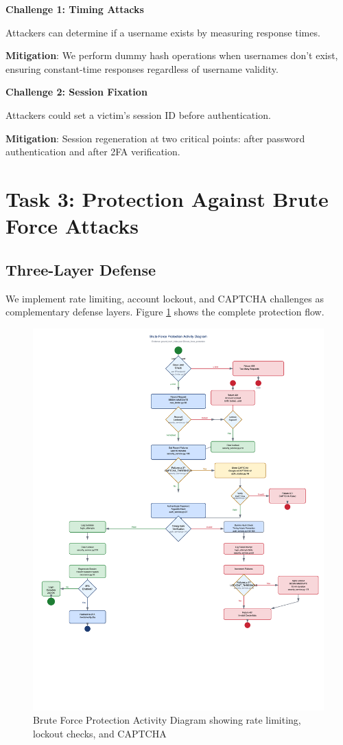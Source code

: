\documentclass[12pt,a4paper]{article}
\begin{document}
\textbf{Challenge 1: Timing Attacks}

Attackers can determine if a username exists by measuring response times.

\textbf{Mitigation}: We perform dummy hash operations when usernames don't exist, ensuring constant-time responses regardless of username validity.

\textbf{Challenge 2: Session Fixation}

Attackers could set a victim's session ID before authentication.

\textbf{Mitigation}: Session regeneration at two critical points: after password authentication and after 2FA verification.

\section{Task 3: Protection Against Brute Force Attacks}

\subsection{Three-Layer Defense}

We implement rate limiting, account lockout, and CAPTCHA challenges as complementary defense layers. Figure \ref{fig:brute_force} shows the complete protection flow.

\begin{figure}[H]
    \centering
    \includegraphics[width=\textwidth]{diagrams/6_brute_force_activity.png}
    \caption{Brute Force Protection Activity Diagram showing rate limiting, lockout checks, and CAPTCHA}
    \label{fig:brute_force}
\end{figure}
\end{document}

